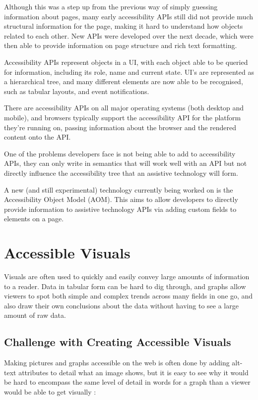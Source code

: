 \documentclass[ %
                    author={Aleena Baig},
                supervisor={Dr Simon Lock},
                    degree={BSc},
                     title={On Making Web Accessible Graphs},
                  subtitle={},
                      year={2019} ]{dissertation}
\begin{document}
Although this was a step up from the previous way of simply guessing information about pages, many early accessibility APIs still did not provide much structural information for the page, making it hard to understand how objects related to each other. New APIs were developed over the next decade, which were then able to provide information on page structure and rich text formatting.

Accessibility APIs represent objects in a UI, with each object able to be queried for information, including its role, name and current state. UI's are represented as a hierarchical tree, and many different elements are now able to be recognised, such as tabular layouts, and event notifications.

There are accessibility APIs on all major operating systems (both desktop and mobile), and browsers typically support the accessibility API for the platform they're running on, passing information about the browser and the rendered content onto the API.

One of the problems developers face is not being able to add to accessibility APIs, they can only write in semantics that will work well with an API but not directly influence the accessibility tree that an assistive technology will form.

A new (and still experimental) technology currently being worked on is the Accessibility Object Model (AOM). This aims to allow developers to directly provide information to assistive technology APIs via adding custom fields to elements on a page.

\section{Accessible Visuals}

Visuals are often used to quickly and easily convey large amounts of information to a reader. Data in tabular form can be hard to dig through, and graphs allow viewers to spot both simple and complex trends across many fields in one go, and also draw their own conclusions about the data without having to see a large amount of raw data.

\subsection{Challenge with Creating Accessible Visuals}

Making pictures and graphs accessible on the web is often done by adding alt-text attributes to detail what an image shows, but it is easy to see why it would be hard to encompass the same level of detail in words for a graph than a viewer would be able to get visually :
\end{document}
